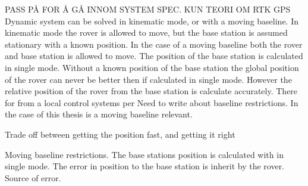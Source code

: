 PASS PÅ FOR Å GÅ INNOM SYSTEM SPEC. KUN TEORI OM RTK GPS
Dynamic system can be solved in kinematic mode, or with a moving baseline. In kinematic mode the rover is allowed to move, but the base station is assumed stationary with a known position. In the case of a moving baseline both the rover and base station is allowed to move. The position of the base station is calculated in single mode. Without a known position of the base station the global position of the rover can never be better then if calculated in single mode. However the relative position of the rover from the base station is calculate accurately. There for from a local control systems per
Need to write about baseline restrictions. In the case of this thesis is a moving baseline relevant.

Trade off between getting the position fast, and getting it right 

Moving baseline restrictions. The base stations position is calculated with in single mode. The error in position to the base station is inherit by the rover. Source of error.

\cleardoublepage